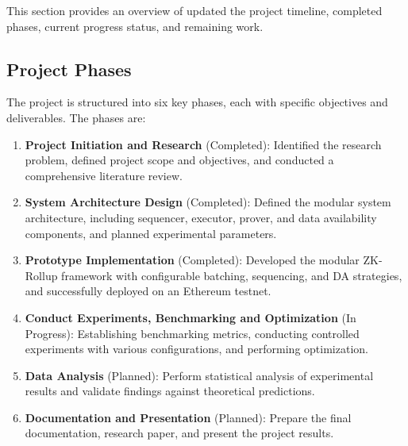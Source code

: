This section provides an overview of updated the project timeline, completed phases, current progress status, and remaining work.

\vspace{12pt}
\subsection{Project Phases}
\vspace{12pt}
The project is structured into six key phases, each with specific objectives and deliverables. The phases are:
\begin{enumerate}
    \item \textbf{Project Initiation and Research} (Completed): Identified the research problem, defined project scope and objectives, and conducted a comprehensive literature review.
    \item \textbf{System Architecture Design} (Completed): Defined the modular system architecture, including sequencer, executor, prover, and data availability components, and planned experimental parameters.
    \item \textbf{Prototype Implementation} (Completed): Developed the modular ZK-Rollup framework with configurable batching, sequencing, and DA strategies, and successfully deployed on an Ethereum testnet.
    \item \textbf{Conduct Experiments, Benchmarking and Optimization} (In Progress): Establishing benchmarking metrics, conducting controlled experiments with various configurations, and performing optimization.
    \item \textbf{Data Analysis} (Planned): Perform statistical analysis of experimental results and validate findings against theoretical predictions.
    \item \textbf{Documentation and Presentation} (Planned): Prepare the final documentation, research paper, and present the project results.
\end{enumerate}

\vspace{12pt}
